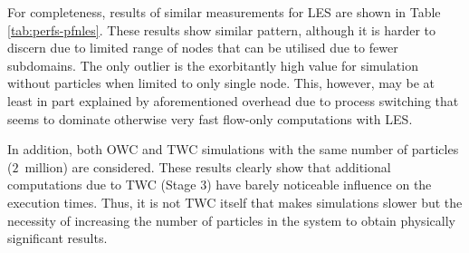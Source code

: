 \documentclass{pracamgren}
\begin{document}
For completeness, results of similar measurements for LES are shown in Table \ref{tab:perfs-pfnles}.
These results show similar pattern, although it is harder to discern due to limited range of nodes that can be utilised due to fewer subdomains.
The only outlier is the exorbitantly high value for simulation without particles when limited to only single node.
This, however, may be at least in part explained by aforementioned overhead due to process switching that seems to dominate otherwise very fast flow-only computations with LES.

In addition, both OWC and TWC simulations with the same number of particles ($2$~million) are considered.
These results clearly show that additional computations due to TWC (Stage 3) have barely noticeable influence on the execution times.
Thus, it is not TWC itself that makes simulations slower but the necessity of increasing the number of particles in the system to obtain physically significant results.
\end{document}
